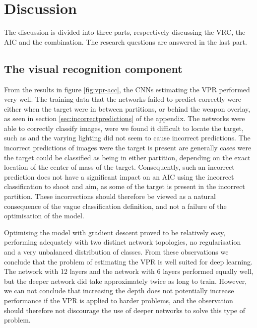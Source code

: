 
\section{Discussion}
\label{sec:discussion}
The discussion is divided into three parts, respectively discussing the VRC, the AIC and the combination. The research questions are answered in the last part.

\subsection{The visual recognition component}
From the results in figure \ref{fig:vpr-acc}, the CNNs estimating the VPR performed very well. The training data that the networks failed to predict correctly were either when the target were in between partitions, or behind the weapon overlay, as seen in section \ref{sec:incorrectpredictions} of the appendix. The networks were able to correctly classify images, were we found it difficult to locate the target, such as  and the varying lighting did not seem to cause incorrect predictions.
The incorrect predictions of images were the target is present are generally cases were the target could be classified as being in either partition, depending on the exact location of the center of mass of the target. Consequently, such an incorrect prediction does not have a significant impact on an AIC using the incorrect classification to shoot and aim, as some of the target is present in the incorrect partition. These incorrections should therefore be viewed as a natural consequence of the vague classification definition, and not a failure of the optimisation of the model.

Optimising the model with gradient descent proved to be relatively easy, performing adequately with two distinct network topologies, no regularisation and a very unbalanced distribution of classes. From these observations we conclude that the problem of estimating the VPR is well suited for deep learning. The network with 12 layers and the network with 6 layers performed equally well, but the deeper network did take approximately twice as long to train. However, we can not conclude that increasing the depth does not potentially increase performance if the VPR is applied to harder problems, and the observation should therefore not discourage the use of deeper networks to solve this type of problem.


